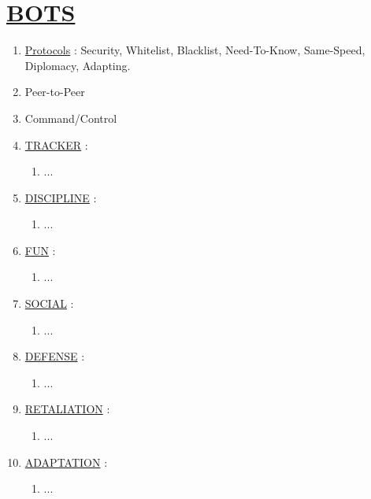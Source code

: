 \documentclass[11pt]{article}
\begin{document}
\section*{\ul{BOTS}}
\begin{enumerate}
	\item[] \ul{Protocols} : Security, Whitelist, Blacklist, Need-To-Know, Same-Speed, Diplomacy, Adapting.
	\item[] Peer-to-Peer
	\item[] Command/Control
	
	\item[] \ul{TRACKER} :
	\begin{enumerate}
		\item[] ...
	\end{enumerate}

	\item[] \ul{DISCIPLINE} :
	\begin{enumerate}
		\item[] ...
	\end{enumerate}

	\item[] \ul{FUN} :
	\begin{enumerate}
		\item[] ...
	\end{enumerate}

	\item[] \ul{SOCIAL} :
	\begin{enumerate}
		\item[] ...
	\end{enumerate}

	\item[] \ul{DEFENSE} :
	\begin{enumerate}
		\item[] ...
	\end{enumerate}

	\item[] \ul{RETALIATION} :
	\begin{enumerate}
		\item[] ...
	\end{enumerate}

	\item[] \ul{ADAPTATION} :
	\begin{enumerate}
		\item[] ...
	\end{enumerate}
\end{enumerate}
\end{document}
